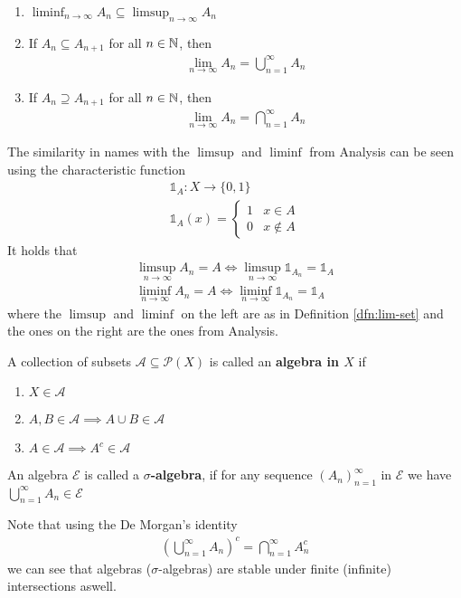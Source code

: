 \begin{rem}[]
  \phantom{a}
  \begin{enumerate}
    \item $\liminf_{n \to \infty}A_n \subseteq \limsup_{n \to \infty}A_n$
    \item If $A_n \subseteq A_{n+1}$ for all $n \in \mathbb{N}$, then
      \begin{align*}
        \lim_{n \to \infty}A_n = \bigcup_{n=1}^{\infty}A_n
      \end{align*}
    \item If $A_n \supseteq A_{n+1}$ for all $n \in \mathbb{N}$, then
      \begin{align*}
        \lim_{n \to \infty}A_n = \bigcap_{n=1}^{\infty}A_n
      \end{align*}
  \end{enumerate}
  The similarity in names with the $\limsup$ and $\liminf$ from Analysis can be seen using the characteristic function 
  \begin{align*}
    \mathds{1}_A: X \to \{0,1\}\\
    \mathds{1}_A(x) = \left\{\begin{array}{ll}
      1 & x \in A \\
      0 & x \notin A
    \end{array} \right.
  \end{align*}
  It holds that
  \begin{align*}
    \limsup_{n \to \infty}A_n = A \iff \limsup_{n \to \infty} \mathds{1}_{A_n} = \mathds{1}_A\\
    \liminf_{n \to \infty}A_n = A \iff \liminf_{n \to \infty} \mathds{1}_{A_n} = \mathds{1}_A
  \end{align*}
  where the $\limsup$ and $\liminf$ on the left are as in Definition \ref{dfn:lim-set} and the ones on the right are the ones from Analysis.
\end{rem}

\begin{dfn}
  A collection of subsets $\mathcal{A} \subseteq \mathcal{P}(X)$ is called an \textbf{algebra in $X$} if
  \begin{enumerate}
    \item $X \in \mathcal{A}$
    \item $A,B \in \mathcal{A} \implies A \cup B \in \mathcal{A}$
    \item $A\in \mathcal{A} \implies A^{c}\in \mathcal{A}$
  \end{enumerate}
  An algebra $\mathcal{E}$ is called a \textbf{$\sigma$-algebra}, if for any sequence $\left(A_{n}\right)_{n = 1}^{\infty}$ in $\mathcal{E}$ we have $\bigcup_{n=1}^{\infty}A_n \in \mathcal{E}$
\end{dfn}
Note that using the De Morgan's identity 
\begin{align*}
  \left(
    \bigcup_{n=1}^{\infty}A_n
  \right)^c
  =
  \bigcap_{n=1}^{\infty}A_n^c
\end{align*}
we can see that algebras ($\sigma$-algebras) are stable under finite (infinite) intersections aswell.




